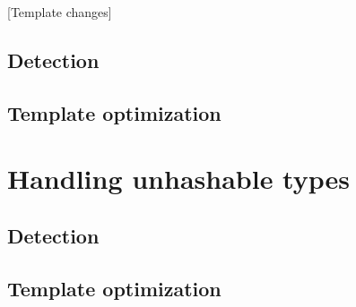 [Template changes]

\subsection{Detection}
\subsection{Template optimization}






\section{Handling unhashable types}
\subsection{Detection}
\subsection{Template optimization}